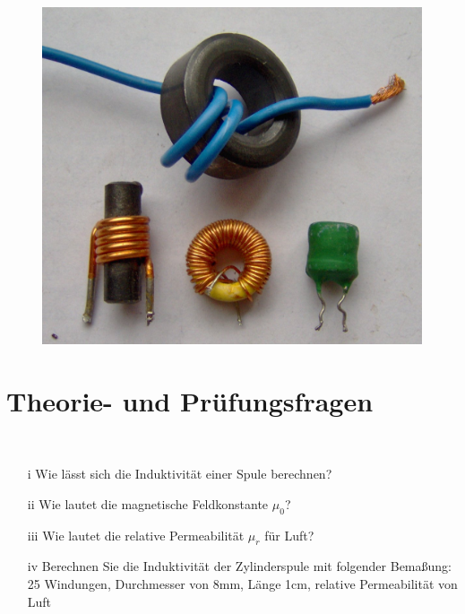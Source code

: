 

\begin{figure}
 \vspace{-5cm}
 \includegraphics[scale=0.1]{Spule/Bilder/Electronic_component_inductors.jpg}
 \vspace{-5cm}
\end{figure}

\section{Theorie- und Prüfungsfragen} 
~~~
\begin{enumerate}
\itemsep1pt\parskip0pt
\item[i] Wie lässt sich die Induktivität einer Spule berechnen?
\item[ii] Wie lautet die magnetische Feldkonstante $\mu_0$?
\item[iii] Wie lautet die relative Permeabilität $\mu_r$ für Luft?
\item[iv] Berechnen Sie die Induktivität der Zylinderspule mit folgender Bemaßung: 25 Windungen, 	Durchmesser von 8mm, Länge 1cm, relative Permeabilität von Luft
\end{enumerate}



